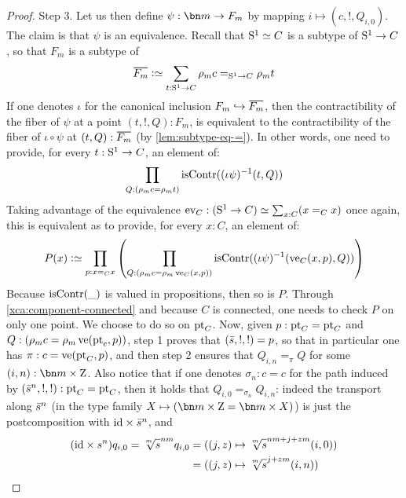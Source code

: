 \begin{proof}
  {\sc Step 3.} Let us then define $\psi: \bn m \to F_m$ by mapping
  $i \mapsto (c,!,Q_{i,0})$. The claim is that $\psi$ is an
  equivalence. Recall that ${\mathrm{S}^1} \simeq C$ is a subtype of ${\mathrm{S}^1} \to C$,
  so that $F_m$ is a subtype of
  \begin{displaymath}
    \casoverline {F_m} \defequi \sum_{t:\Sc \to C}\cdg{m}c=_{\Sc\to C}\cdg{m}t
  \end{displaymath}
  If one denotes $\iota$ for the canonical inclusion
  $F_m\mono \casoverline{F_m}$, then the contractibility of the fiber of
  $\psi$ at a point $(t,!,Q):F_m$, is equivalent to the
  contractibility of the fiber of $\iota\circ\psi$ at
  $(t,Q):\casoverline{F_m}$ (by \cref{lem:subtype-eq-=}).  In other
  words, one need to provide, for every $t:{\mathrm{S}^1} \to C$, an element of:
  \begin{displaymath}
    \prod_{Q:(\cdg{m}c=\cdg{m}t)} \iscontr(\inv {(\iota \psi)} (t,Q))
  \end{displaymath}
  Taking advantage of the equivalence
  $\ev_C: (\Sc \to C) \weq \sum_{x:C}(x=_Cx)$ once again, this is
  equivalent as to provide, for every $x:C$, an element of:
  \begin{displaymath}
    P(x) \defequi \prod_{p:x=_Cx}
    \left(
      \prod_{Q:(\cdg{m}c=\cdg{m}\ve_C(x,p))} \iscontr(\inv {(\iota \psi)} (\ve_C(x,p),Q))
    \right)
  \end{displaymath}
  Because $\iscontr(\blank)$ is valued in propositions, then so is
  $P$. Through \cref{xca:component-connected} and because $C$ is
  connected, one needs to check $P$ on only one point. We choose to do
  so on $\mathrm{pt}_C$. Now, given $p:\mathrm{pt}_C = \mathrm{pt}_C$ and
  $Q:(\cdg{m}c=\cdg{m}\ve(\pt_c,p))$, step 1 proves that
  $(\bar {s}, !,!)=p$, so that in particular one has
  $\pi:c=\ve(\pt_C,p)$, and then step 2 ensures that $Q_{i,n}=_\pi Q$
  for some $(i,n):\bn m \times \zet$. Also notice that if one denotes
  $\sigma_n:c = c$ for the path induced by $(\bar {s}^n,!,!): \mathrm{pt}_C=\mathrm{pt}_C$,
  then it holds that $Q_{i,0}=_{\sigma_n}Q_{i,n}$: indeed the
  transport along $\bar {s}^n$ (in the type family
  $X \mapsto (\bn m\times \zet = \bn m\times X)$) is just the
  postcomposition with $\mathord{\mathrm{id}} \times \bar {s}^n$, and
  \begin{displaymath}
    \begin{split}
      (\id\times s^n) q_{i,0} = \sqrt[\uproot{2}m]s^{nm}q_{i,0} &= ((j,z)\mapsto \sqrt[\uproot{2}m]s^{nm+j+zm}(i,0))\\
      &= ((j,z)\mapsto \sqrt[\uproot{2}m]s^{j+zm}(i,n)) \\

\end{split}
\end{displaymath}
\end{proof}
